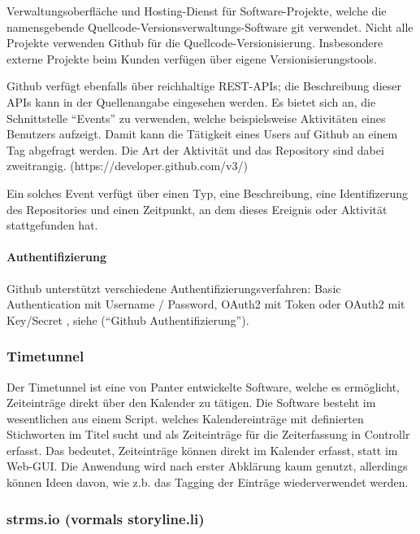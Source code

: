 \documentclass[]{article}
\begin{document}
Verwaltungsoberfläche und Hosting-Dienst für Software-Projekte, welche
die namensgebende Quellcode-Versionsverwaltungs-Software git verwendet.
Nicht alle Projekte verwenden Github für die Quellcode-Versionisierung.
Insbesondere externe Projekte beim Kunden verfügen über eigene
Versionisierungstools.

Github verfügt ebenfalls über reichhaltige REST-APIs; die Beschreibung
dieser APIs kann in der Quellenangabe eingesehen werden. Es bietet sich
an, die Schnittstelle ``Events'' zu verwenden, welche beispielsweise
Aktivitäten eines Benutzers aufzeigt. Damit kann die Tätigkeit eines
Users auf Github an einem Tag abgefragt werden. Die Art der Aktivität
und das Repository sind dabei zweitrangig.
(https://developer.github.com/v3/)

Ein solches Event verfügt über einen Typ, eine Beschreibung, eine
Identifizerung des Repositories und einen Zeitpunkt, an dem dieses
Ereignis oder Aktivität stattgefunden hat.

\paragraph{Authentifizierung}\label{authentifizierung-3}

Github unterstützt verschiedene Authentifizierungsverfahren: Basic
Authentication mit Username / Password, OAuth2 mit Token oder OAuth2 mit
Key/Secret , siehe (``Github Authentifizierung'').

\subsubsection{Timetunnel}\label{timetunnel}

Der Timetunnel ist eine von Panter entwickelte Software, welche es
ermöglicht, Zeiteinträge direkt über den Kalender zu tätigen. Die
Software besteht im wesentlichen aus einem Script. welches
Kalendereinträge mit definierten Stichworten im Titel sucht und als
Zeiteinträge für die Zeiterfassung in Controllr erfasst. Das bedeutet,
Zeiteinträge können direkt im Kalender erfasst, statt im Web-GUI. Die
Anwendung wird nach erster Abklärung kaum genutzt, allerdings können
Ideen davon, wie z.b. das Tagging der Einträge wiederverwendet werden.

\subsubsection{strms.io (vormals
storyline.li)}\label{strms.io-vormals-storyline.li}
\end{document}
